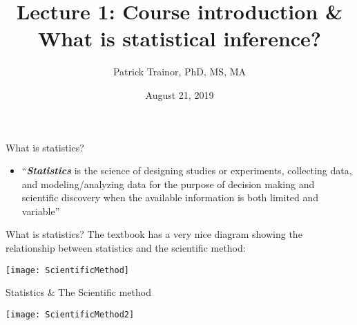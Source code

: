 \documentclass[xcolor=dvipsnames]{beamer}
\title[Lecture 1]{Lecture 1: Course introduction \& What is statistical inference?}
\author[Patrick Trainor]{Patrick Trainor, PhD, MS, MA}
\institute[NMSU]{New Mexico State University}
\date{August 21, 2019}
\begin{document}
	
\begin{frame}
    \maketitle
\end{frame}

\begin{frame}{What is statistics?}
	\begin{itemize}
		\item ``\textbf{\textit{Statistics}} is the science of designing studies or experiments, collecting data, and modeling/analyzing data for the purpose of decision making and scientific discovery when the available information is both limited and variable''
	\end{itemize}
\end{frame}

\begin{frame}{What is statistics?}
	\vspace{-12pt}
	The textbook has a very nice diagram showing the relationship between statistics and the scientific method: \vspace{5pt}
	
	\begin{center}
		\texttt{[image: ScientificMethod]}
	\end{center}
\end{frame}

\begin{frame}{Statistics \& The Scientific method}
	\vspace{-12pt}
	\begin{center}
		\texttt{[image: ScientificMethod2]}
	\end{center}
\end{frame}
\end{document}
